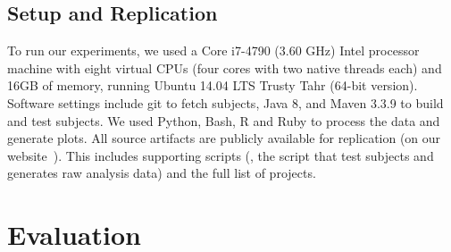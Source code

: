 \subsection{Setup and Replication}
\label{sec:setup}

To run our experiments, we used a Core i7-4790 (3.60 GHz) Intel
processor machine with eight virtual CPUs (four cores with two native
threads each) and 16GB of memory, running Ubuntu 14.04 LTS Trusty Tahr
(64-bit version).  Software settings include git to fetch
subjects, Java 8, and Maven 3.3.9 to build and test subjects. We used
Python, Bash, R and Ruby to process the
data and generate plots.  All source artifacts are publicly available
for replication (on our website~\cite{ourwebpage}).  This
includes supporting scripts (\eg, the script that test subjects and
generates raw analysis data) and the full list of projects. 


\section{Evaluation}
\label{sec:eval}



